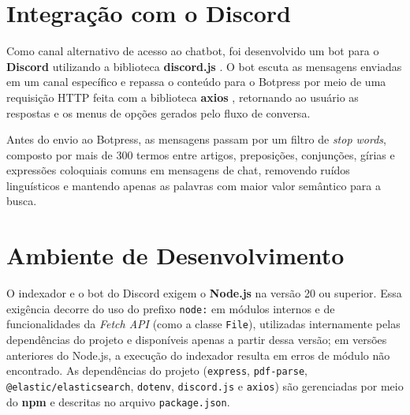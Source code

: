 \section{Integração com o Discord}\label{sec:integracao-discord}

Como canal alternativo de acesso ao chatbot, foi desenvolvido um bot para o \textbf{Discord} utilizando a biblioteca \textbf{discord.js} \cite{discordjs-docs}. O bot escuta as mensagens enviadas em um canal específico e repassa o conteúdo para o Botpress por meio de uma requisição HTTP feita com a biblioteca \textbf{axios} \cite{axios-npm}, retornando ao usuário as respostas e os menus de opções gerados pelo fluxo de conversa.

Antes do envio ao Botpress, as mensagens passam por um filtro de \textit{stop words}, composto por mais de 300 termos entre artigos, preposições, conjunções, gírias e expressões coloquiais comuns em mensagens de chat, removendo ruídos linguísticos e mantendo apenas as palavras com maior valor semântico para a busca.

\section{Ambiente de Desenvolvimento}\label{sec:ambiente-desenvolvimento}

O indexador e o bot do Discord exigem o \textbf{Node.js} na versão 20 ou superior. Essa exigência decorre do uso do prefixo \texttt{node:} em módulos internos e de funcionalidades da \textit{Fetch API} (como a classe \texttt{File}), utilizadas internamente pelas dependências do projeto e disponíveis apenas a partir dessa versão; em versões anteriores do Node.js, a execução do indexador resulta em erros de módulo não encontrado. As dependências do projeto (\texttt{express}, \texttt{pdf-parse}, \texttt{@elastic/elasticsearch}, \texttt{dotenv}, \texttt{discord.js} e \texttt{axios}) são gerenciadas por meio do \textbf{npm} e descritas no arquivo \texttt{package.json}.

